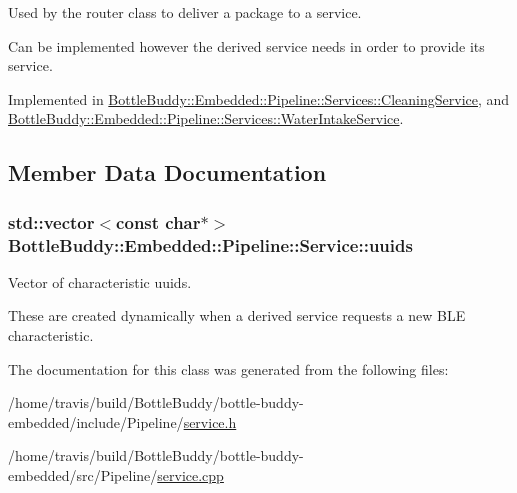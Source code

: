 Used by the router class to deliver a package to a service. 

Can be implemented however the derived service needs in order to provide its service. 

Implemented in \hyperlink{class_bottle_buddy_1_1_embedded_1_1_pipeline_1_1_services_1_1_cleaning_service_a6d3dee7ca6387c00cec3478821b1ea23}{Bottle\+Buddy\+::\+Embedded\+::\+Pipeline\+::\+Services\+::\+Cleaning\+Service}, and \hyperlink{class_bottle_buddy_1_1_embedded_1_1_pipeline_1_1_services_1_1_water_intake_service_abfa1b38af16fae314c3ba3f80b2bf785}{Bottle\+Buddy\+::\+Embedded\+::\+Pipeline\+::\+Services\+::\+Water\+Intake\+Service}.



\subsection{Member Data Documentation}
\subsubsection[{\texorpdfstring{uuids}{uuids}}]{\setlength{\rightskip}{0pt plus 5cm}std\+::vector$<$const char$\ast$$>$ Bottle\+Buddy\+::\+Embedded\+::\+Pipeline\+::\+Service\+::uuids\hspace{0.3cm}{\ttfamily [protected]}}\hypertarget{class_bottle_buddy_1_1_embedded_1_1_pipeline_1_1_service_a543fc4a07564a076ffc2835510763e5f}{}\label{class_bottle_buddy_1_1_embedded_1_1_pipeline_1_1_service_a543fc4a07564a076ffc2835510763e5f}


Vector of characteristic uuids. 

These are created dynamically when a derived service requests a new B\+LE characteristic. 

The documentation for this class was generated from the following files\+:\begin{DoxyCompactItemize}
\item 
/home/travis/build/\+Bottle\+Buddy/bottle-\/buddy-\/embedded/include/\+Pipeline/\hyperlink{service_8h}{service.\+h}\item 
/home/travis/build/\+Bottle\+Buddy/bottle-\/buddy-\/embedded/src/\+Pipeline/\hyperlink{service_8cpp}{service.\+cpp}\end{DoxyCompactItemize}
